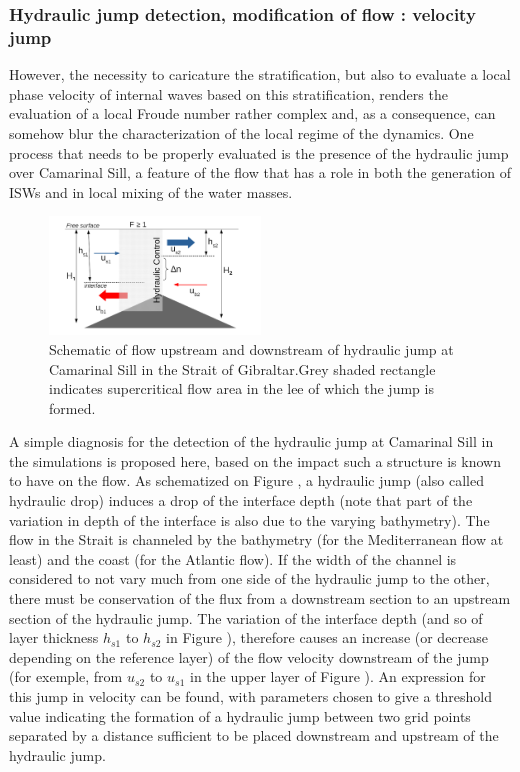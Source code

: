 \subsubsection{Hydraulic jump detection, \color{red}modification of flow : velocity jump\color{black}}
\label{sectiondiagJump}

However, the necessity to caricature the stratification, but also to evaluate a local phase velocity of internal waves based on this stratification, renders the evaluation of a local Froude number rather complex and, as a consequence, can somehow blur the characterization of the local regime of the dynamics. One process that needs to be properly evaluated is the presence of the hydraulic jump over Camarinal Sill, a feature of the flow that has a role in both the generation of ISWs and in local mixing of the water masses.

\begin{figure}[!h]
 \centering
 \includegraphics[width=0.5\textwidth]{./GBR3D/schema_diagressaut.png}
 \caption {Schematic of flow upstream and downstream of hydraulic jump at Camarinal Sill in the Strait of Gibraltar.\color{red}Grey shaded rectangle indicates supercritical flow area in the lee of which the jump is formed.\color{black}}
  \label{schemaRH}
\end{figure}

\color{red}A simple diagnosis for the detection of the hydraulic jump at Camarinal Sill in the simulations is proposed here, based on the impact such a structure is known to have on the flow. 
As schematized on Figure , a hydraulic jump (also called hydraulic drop) induces a drop of the interface depth (note that part of the variation in depth of the interface is also due to the varying bathymetry). The flow in the Strait is channeled by the bathymetry (for the Mediterranean flow at least) and the coast (for the Atlantic flow). If the width of the channel is considered to not vary much from one side of the hydraulic jump to the other, there must be conservation of the flux from a downstream section to an upstream section of the hydraulic jump. The variation of the interface depth (and so of layer thickness $h_{s1}$ to $h_{s2}$ in Figure ), therefore causes an increase (or decrease depending on the reference layer) of the flow velocity downstream of the jump (for exemple, from $u_{s2}$ to $u_{s1}$ in the upper layer of Figure ). An expression for this jump in velocity can be found, with parameters chosen to give a threshold value indicating the formation of a hydraulic jump between two grid points separated by a distance sufficient to be placed downstream and upstream of the hydraulic jump.\color{black}

